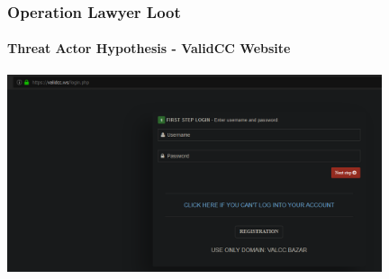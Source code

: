 \documentclass[aspectratio=169]{beamer}
\begin{document}
{
\begin{frame}
  \frametitle{Operation Lawyer Loot}
  \framesubtitle{Threat Actor Hypothesis - ValidCC Website}
  \begin{center}
    \includegraphics[width=11cm]{validcc-website}
  \end{center}
\end{frame}
}
\end{document}
